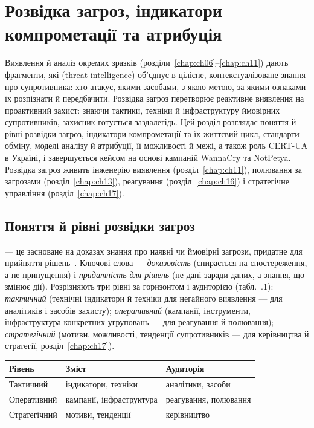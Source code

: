 \chapter{Розвідка загроз, індикатори компрометації та атрибуція}
\label{chap:ch12}

Виявлення й аналіз окремих зразків (розділи~\ref{chap:ch06}--\ref{chap:ch11}) дають фрагменти, які  (threat intelligence) об'єднує в цілісне, контекстуалізоване знання про супротивника: хто атакує, якими засобами, з якою метою, за якими ознаками їх розпізнати й передбачити. Розвідка загроз перетворює реактивне виявлення на проактивний захист: знаючи тактики, техніки й інфраструктуру ймовірних супротивників, захисник готується заздалегідь. Цей розділ розглядає поняття й рівні розвідки загроз, індикатори компрометації та їх життєвий цикл, стандарти обміну, моделі аналізу й атрибуції, її можливості й межі, а також роль CERT-UA в Україні, і завершується кейсом на основі кампаній WannaCry та NotPetya. Розвідка загроз живить інженерію виявлення (розділ~\ref{chap:ch11}), полювання за загрозами (розділ~\ref{chap:ch13}), реагування (розділ~\ref{chap:ch16}) і стратегічне управління (розділ~\ref{chap:ch17}).

\section{Поняття й рівні розвідки загроз}\label{sec:ch12-levels}

 --- це засноване на доказах знання про наявні чи ймовірні загрози, придатне для прийняття рішень~\cite{ch12:mcmillan}. Ключові слова --- \emph{доказовість} (спирається на спостереження, а не припущення) і \emph{придатність для рішень} (не дані заради даних, а знання, що змінює дії). Розрізняють три рівні за горизонтом і аудиторією (табл.~\thechapter.1): \emph{тактичний} (технічні індикатори й техніки для негайного виявлення --- для аналітиків і засобів захисту); \emph{оперативний} (кампанії, інструменти, інфраструктура конкретних угруповань --- для реагування й полювання); \emph{стратегічний} (мотиви, можливості, тенденції супротивників --- для керівництва й стратегії, розділ~\ref{chap:ch17}).


\begin{center}\footnotesize
\begin{tabularx}{\linewidth}{L{20mm} Y L{20mm}}
\toprule
Рівень & Зміст & Аудиторія \\
\midrule
Тактичний & індикатори, техніки & аналітики, засоби \\
Оперативний & кампанії, інфраструктура & реагування, полювання \\
Стратегічний & мотиви, тенденції & керівництво \\
\bottomrule
\end{tabularx}
\end{center}

